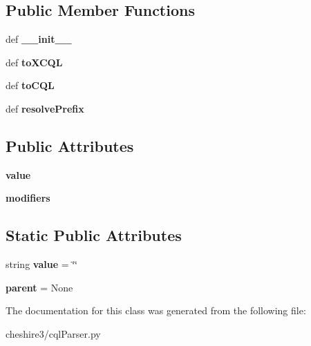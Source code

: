 \subsection*{Public Member Functions}
\begin{DoxyCompactItemize}
\item 
\hypertarget{classcheshire3_1_1cql_parser_1_1_boolean_ac4484401e12ce4502484fd45805a8e4b}{def {\bfseries \-\_\-\-\_\-init\-\_\-\-\_\-}}\label{classcheshire3_1_1cql_parser_1_1_boolean_ac4484401e12ce4502484fd45805a8e4b}

\item 
\hypertarget{classcheshire3_1_1cql_parser_1_1_boolean_a151a50c557810a8518c2bc5a44e3aae4}{def {\bfseries to\-X\-C\-Q\-L}}\label{classcheshire3_1_1cql_parser_1_1_boolean_a151a50c557810a8518c2bc5a44e3aae4}

\item 
\hypertarget{classcheshire3_1_1cql_parser_1_1_boolean_a3d49065017da4903e627dd0b4df60217}{def {\bfseries to\-C\-Q\-L}}\label{classcheshire3_1_1cql_parser_1_1_boolean_a3d49065017da4903e627dd0b4df60217}

\item 
\hypertarget{classcheshire3_1_1cql_parser_1_1_boolean_ae3eab48d3b43425101e949ad0c7f2851}{def {\bfseries resolve\-Prefix}}\label{classcheshire3_1_1cql_parser_1_1_boolean_ae3eab48d3b43425101e949ad0c7f2851}

\end{DoxyCompactItemize}
\subsection*{Public Attributes}
\begin{DoxyCompactItemize}
\item 
\hypertarget{classcheshire3_1_1cql_parser_1_1_boolean_aef0fcef9a53bf04555ba24ad228838d6}{{\bfseries value}}\label{classcheshire3_1_1cql_parser_1_1_boolean_aef0fcef9a53bf04555ba24ad228838d6}

\item 
\hypertarget{classcheshire3_1_1cql_parser_1_1_boolean_a4145de22e9074374f5b1ea9da7e8d0ad}{{\bfseries modifiers}}\label{classcheshire3_1_1cql_parser_1_1_boolean_a4145de22e9074374f5b1ea9da7e8d0ad}

\end{DoxyCompactItemize}
\subsection*{Static Public Attributes}
\begin{DoxyCompactItemize}
\item 
\hypertarget{classcheshire3_1_1cql_parser_1_1_boolean_ab0aa3544ef42e5e4a0330e060fc8c5fa}{string {\bfseries value} = \char`\"{}\char`\"{}}\label{classcheshire3_1_1cql_parser_1_1_boolean_ab0aa3544ef42e5e4a0330e060fc8c5fa}

\item 
\hypertarget{classcheshire3_1_1cql_parser_1_1_boolean_a8c0a1ed67c9bb409fddd0cec3cc00c38}{{\bfseries parent} = None}\label{classcheshire3_1_1cql_parser_1_1_boolean_a8c0a1ed67c9bb409fddd0cec3cc00c38}

\end{DoxyCompactItemize}


The documentation for this class was generated from the following file\-:\begin{DoxyCompactItemize}
\item 
cheshire3/cql\-Parser.\-py\end{DoxyCompactItemize}
